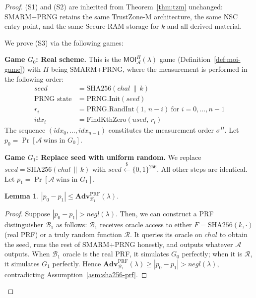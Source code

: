 \documentclass[journal]{IEEEtran}
\newcommand{\rtsmarmone}{SMARM+PRNG\xspace}
\newtheorem{lemma}{Lemma}[section]
\newcommand{\Adv}{\mathbf{Adv}}
\begin{document}
\begin{proof}
(S1) and (S2) are inherited from Theorem~\ref{thm:tzm} unchanged:
SMARM+PRNG retains the same TrustZone-M architecture, the same NSC entry
point, and the same Secure-RAM storage for $k$ and all derived material.
 
We prove (S3) via the following games:
 
\medskip
\noindent\textbf{Game $G_0$: Real scheme.}
This is the $\mathsf{MOI}^\Pi_{\mathcal{A}}(\lambda)$ game
(Definition~\ref{def:moi-game}) with $\Pi$ being \rtsmarmone, where the measurement is performed in the following order:
\begin{align*}
  \mathit{seed}    &= \mathrm{SHA256}(\mathit{chal} \,\|\, k) \\
  \text{PRNG state} &= \mathrm{PRNG.Init}(\mathit{seed}) \\
  r_i              &= \mathrm{PRNG.RandInt}(1,\, n-i)
                      \ \text{for } i = 0,\dots,n-1 \\
  \mathit{idx}_i   &= \mathrm{FindKthZero}(\mathit{used},\, r_i)
\end{align*}
The sequence $(\mathit{idx}_0,\dots,\mathit{idx}_{n-1})$ constitutes the
measurement order $\sigma^\Pi$.
Let $p_0 = \Pr[\mathcal{A}\ \text{wins in } G_0]$.
 
\medskip
\noindent\textbf{Game $G_1$: Replace seed with uniform random.}
We replace $\mathit{seed} = \mathrm{SHA256}(\mathit{chal} \,\|\, k)$ with
$\mathit{seed} \xleftarrow{\$} \{0,1\}^{256}$.
All other steps are identical.
Let $p_1 = \Pr[\mathcal{A}\ \text{wins in } G_1]$.
 
\begin{lemma}
\label{lem:g0-g1}
$|p_0 - p_1| \leq \Adv^{\mathrm{PRF}}_{\mathcal{B}_1}(\lambda)$.
\end{lemma}
\begin{proof}
Suppose $|p_0 - p_1| > negl(\lambda)$.
Then, we can construct a PRF distinguisher $\mathcal{B}_1$ as follows:
$\mathcal{B}_1$ receives oracle access to either $F = \mathrm{SHA256}(k,\cdot)$
(real PRF) or a truly random function $\mathcal{R}$.
It queries its oracle on $\mathit{chal}$ to obtain the seed, runs the rest
of \rtsmarmone honestly, and outputs whatever $\mathcal{A}$ outputs.
When $\mathcal{B}_1$ oracle is the real PRF, it simulates $G_0$ perfectly;
when it is $\mathcal{R}$, it simulates $G_1$ perfectly.
Hence $\Adv^{\mathrm{PRF}}_{\mathcal{B}_1}(\lambda) \ge |p_0 - p_1| > negl(\lambda)$,
contradicting Assumption~\ref{asm:sha256-prf}.
\end{proof}
 

\end{proof}
\end{document}
